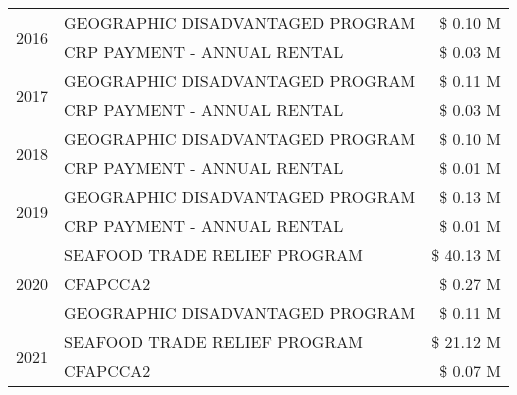 \begin{tabular}{llr}
\cline{1-3}
\multirow[t]{2}{*}{2016} & GEOGRAPHIC DISADVANTAGED PROGRAM              & \$ 0.10 M \\
 & CRP PAYMENT - ANNUAL RENTAL                   & \$ 0.03 M \\
\cline{1-3}
\multirow[t]{2}{*}{2017} & GEOGRAPHIC DISADVANTAGED PROGRAM & \$ 0.11 M \\
 & CRP PAYMENT - ANNUAL RENTAL & \$ 0.03 M \\
\cline{1-3}
\multirow[t]{2}{*}{2018} & GEOGRAPHIC DISADVANTAGED PROGRAM & \$ 0.10 M \\
 & CRP PAYMENT - ANNUAL RENTAL & \$ 0.01 M \\
\cline{1-3}
\multirow[t]{2}{*}{2019} & GEOGRAPHIC DISADVANTAGED PROGRAM & \$ 0.13 M \\
 & CRP PAYMENT - ANNUAL RENTAL & \$ 0.01 M \\
\cline{1-3}
\multirow[t]{3}{*}{2020} & SEAFOOD TRADE RELIEF PROGRAM & \$ 40.13 M \\
 & CFAPCCA2 & \$ 0.27 M \\
 & GEOGRAPHIC DISADVANTAGED PROGRAM & \$ 0.11 M \\
\cline{1-3}
\multirow[t]{2}{*}{2021} & SEAFOOD TRADE RELIEF PROGRAM & \$ 21.12 M \\
 & CFAPCCA2 & \$ 0.07 M \\
\cline{1-3}
\bottomrule
\end{tabular}
